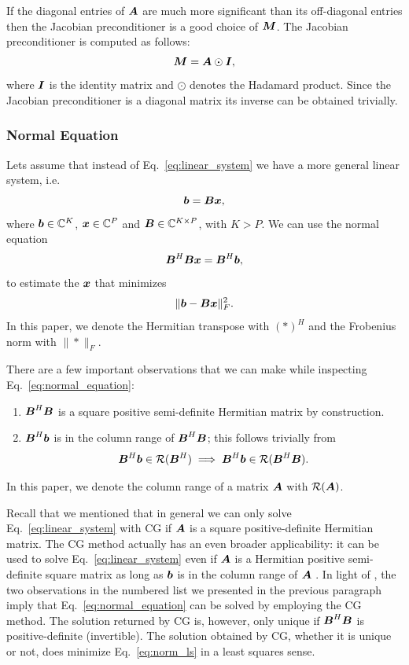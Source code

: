 \documentclass[useAMS,usenatbib]{mn2e}
\newcommand{\bA}{\bmath{A}}
\newcommand{\bB}{\bmath{B}}
\newcommand{\bM}{\bmath{M}}
\newcommand{\bI}{\bmath{I}}
\newcommand{\bb}{\bmath{b}}
\newcommand{\bx}{\bmath{x}}
\begin{document}
If the diagonal entries of $\bA$ are much more significant than its off-diagonal entries then the 
Jacobian preconditioner is a good choice of $\bM$. The Jacobian preconditioner is computed as follows:
\begin{equation}
\bM = \bA\odot\bI, 
\end{equation}
where $\bI$ is the identity matrix and $\odot$ denotes the Hadamard product. Since the Jacobian preconditioner is a diagonal matrix its inverse can be obtained trivially.

\subsubsection{Normal Equation}
\label{sec:normal}
Lets assume that instead of Eq.~\eqref{eq:linear_system} we have a more general linear system, i.e.
\begin{equation}
 \bb = \bB\bx,
\end{equation}
where $\bb\in\mathbb{C}^K$, $\bx\in\mathbb{C}^P$  and $\bB\in\mathbb{C}^{K \times P}$, with $K > P$. We can use the normal equation 
\begin{equation}
\label{eq:normal_equation}
\bB^H\bB\bx = \bB^H\bb, 
\end{equation}
to estimate the $\bx$ that minimizes
\begin{equation}
\label{eq:norm_ls}
\|\bb-\bB\bx\|_F^2. 
\end{equation}
In this paper, we denote the Hermitian transpose with $(*)^H$ and the Frobenius norm with $\|*\|_F$.

There are a few important observations that we can make while inspecting Eq.~\eqref{eq:normal_equation}:
\begin{enumerate}
\item $\bB^H\bB$ is a square positive semi-definite Hermitian matrix by construction.
\item $\bB^H\bb$ is in the column range of $\bB^H\bB$; this follows trivially from 
\begin{equation}
\bB^H\bb \in \mathcal{R}(\bB^H) \implies \bB^H\bb \in \mathcal{R}(\bB^H\bB).   
\end{equation}
\end{enumerate}
In this paper, we denote the column range of a matrix $\bA$ with $\mathcal{R}(\bA)$.

Recall that we mentioned that in general we can only solve Eq.~\eqref{eq:linear_system} with CG if $\bA$ is a square positive-definite Hermitian matrix. The CG method actually has an even broader applicability: it can be used to solve Eq.~\eqref{eq:linear_system} even if $\bA$ is a Hermitian positive semi-definite
square matrix as long as $\bb$ is in the column range of $\bA$ \citep{Lu2015}. In light of \citet{Lu2015}, the two observations in the numbered list we presented in the previous paragraph imply that Eq.~\eqref{eq:normal_equation}
can be solved by employing the CG method. The solution returned by CG is, however, only unique if $\bB^H\bB$ is positive-definite (invertible). The solution
obtained by CG, whether it is unique or not, does minimize Eq.~\eqref{eq:norm_ls} in a least squares sense.
\end{document}

